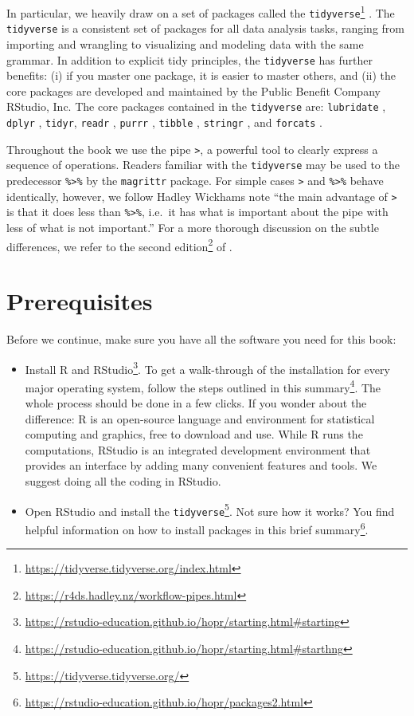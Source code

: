 \documentclass[
]{book}
\providecommand{\tightlist}{%
  \setlength{\itemsep}{0pt}\setlength{\parskip}{0pt}}
\renewcommand{\href}[2]{#2\footnote{\url{#1}}}
\begin{document}
In particular, we heavily draw on a set of packages called the \href{https://tidyverse.tidyverse.org/index.html}{\texttt{tidyverse}} \citep{Wickham2019}.
The \texttt{tidyverse} is a consistent set of packages for all data analysis tasks, ranging from importing and wrangling to visualizing and modeling data with the same grammar.
In addition to explicit tidy principles, the \texttt{tidyverse} has further benefits: (i) if you master one package, it is easier to master others, and (ii) the core packages are developed and maintained by the Public Benefit Company RStudio, Inc.
The core packages contained in the \texttt{tidyverse} \citep{tidyverse} are: \texttt{lubridate} \citep{lubridate}, \texttt{dplyr} \citep{dplyr}, \texttt{tidyr}\citep{tidyr}, \texttt{readr} \citep{readr}, \texttt{purrr} \citep{purrr}, \texttt{tibble} \citep{tibble}, \texttt{stringr} \citep{stringr}, and \texttt{forcats} \citep{forcats}.

Throughout the book we use the pipe \texttt{\textbar{}\textgreater{}}, a powerful tool to clearly express a sequence of operations. Readers familiar with the \texttt{tidyverse} may be used to the predecessor \texttt{\%\textgreater{}\%} by the \texttt{magrittr} package. For simple cases \texttt{\textbar{}\textgreater{}} and \texttt{\%\textgreater{}\%} behave identically, however, we follow Hadley Wickhams note ``the main advantage of \texttt{\textbar{}\textgreater{}} is that it does less than \texttt{\%\textgreater{}\%}, i.e.~it has what is important about the pipe with less of what is not important.'' For a more thorough discussion on the subtle differences, we refer to the \href{https://r4ds.hadley.nz/workflow-pipes.html}{second edition} of \citet{Wickham2016}.

\hypertarget{prerequisites}{%
\section*{Prerequisites}\label{prerequisites}}


Before we continue, make sure you have all the software you need for this book:

\begin{itemize}
\tightlist
\item
  \href{https://rstudio-education.github.io/hopr/starting.html\#starting}{Install R and RStudio}. To get a walk-through of the installation for every major operating system, follow the steps outlined \href{https://rstudio-education.github.io/hopr/starting.html\#starthng}{in this summary}. The whole process should be done in a few clicks. If you wonder about the difference: R is an open-source language and environment for statistical computing and graphics, free to download and use. While R runs the computations, RStudio is an integrated development environment that provides an interface by adding many convenient features and tools. We suggest doing all the coding in RStudio.
\item
  Open RStudio and \href{https://tidyverse.tidyverse.org/}{install the \texttt{tidyverse}}. Not sure how it works? You find helpful information on how to install packages in this \href{https://rstudio-education.github.io/hopr/packages2.html}{brief summary}.
\end{itemize}
\end{document}
